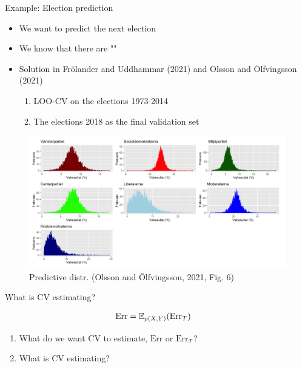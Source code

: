 \documentclass[10pt]{beamer}
\begin{document}
\begin{frame}{Example: Election prediction}

\begin{itemize}
\item We want to predict the next election
\item We know that there are ""
\item Solution in Frölander and Uddhammar (2021) and Olsson and Ölfvingsson (2021)
\begin{enumerate}
\item LOO-CV on the elections 1973-2014
\item The elections 2018 as the final validation set
\end{enumerate}


\end{itemize}

\begin{figure}[h]
\caption{Predictive distr. (Olsson and Ölfvingsson, 2021, Fig. 6)}
\centering
\includegraphics[width=1\textwidth]{figs/elections}
\end{figure}

\end{frame}


\begin{frame}{What is CV estimating?}

\begin{align*}
\text{Err} & = \operatorname{\mathbb{E}}_{p(X,Y)} (\text{Err}_\mathcal{T})
\end{align*}

\begin{enumerate}
\item What do we want CV to estimate, $\text{Err}$ or $\text{Err}_\mathcal{T}$?
\pause
\item What is CV estimating?
\end{enumerate}

\end{frame}
\end{document}
